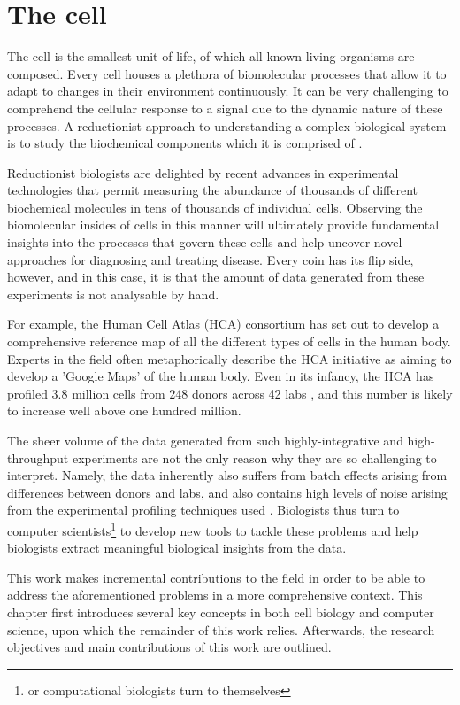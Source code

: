 \section{The cell}
The cell is the smallest unit of life, of which all known living organisms are composed. Every cell houses a plethora of biomolecular processes that allow it to adapt to changes in their environment continuously. It can be very challenging to comprehend the cellular response to a signal due to the dynamic nature of these processes. A reductionist approach to understanding a complex biological system is to study the biochemical components which it is comprised of \cite{brigandt_reductionismbiology_2017}.

Reductionist biologists are delighted by recent advances in experimental technologies that permit measuring the abundance of thousands of different biochemical molecules in tens of thousands of individual cells.  Observing the biomolecular insides of cells in this manner will ultimately provide fundamental insights into the processes that govern these cells and help uncover novel approaches for diagnosing and treating disease. Every coin has its flip side, however, and in this case, it is that the amount of data generated from these experiments is not analysable by hand.  

For example, the Human Cell Atlas (HCA) consortium \cite{regev_humancellatlas_2018} has set out to develop a comprehensive reference map of all the different types of cells in the human body. Experts in the field often metaphorically describe the HCA initiative as aiming to develop a 'Google Maps' of the human body. Even in its infancy, the HCA has profiled 3.8 million cells from 248 donors across 42 labs \cite{humancellatlasconsortium_humancellatlas_2018}, and this number is likely to increase well above one hundred million.

The sheer volume of the data generated from such highly-integrative and high-throughput experiments are not the only reason why they are so challenging to interpret. Namely, the data inherently also suffers from batch effects arising from differences between donors and labs, and also contains high levels of noise arising from the experimental profiling techniques used \cite{hon_humancellatlas_2018}. Biologists thus turn to computer scientists\footnote{or computational biologists turn to themselves} to develop new tools to tackle these problems and help biologists extract meaningful biological insights from the data.

This work makes incremental contributions to the field in order to be able to address the aforementioned problems in a more comprehensive context. This chapter first introduces several key concepts in both cell biology and computer science, upon which the remainder of this work relies. Afterwards, the research objectives and main contributions of this work are outlined.

